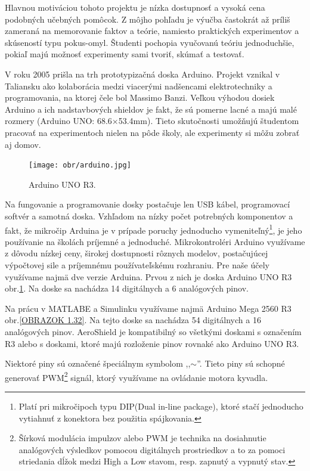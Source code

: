 Hlavnou motiváciou tohoto projektu je nízka dostupnosť a vysoká cena podobných učebných pomôcok. Z môjho pohľadu je výučba častokrát až príliš zameraná na memorovanie faktov a teórie, namiesto praktických experimentov a skúseností typu pokus-omyl. Študenti pochopia vyučovanú teóriu jednoduchšie, pokiaľ majú možnosť experimenty sami tvoriť, skúmať a testovať\cite{Dhanapal2013ASO}. 

V roku 2005 prišla na trh prototypizačná doska Arduino. Projekt vznikal v Taliansku ako kolaborácia medzi viacerými nadšencami elektrotechniky a programovania, na ktorej čele bol Massimo Banzi. Veľkou výhodou dosiek Arduino a ich nadstavbových shieldov je fakt, že sú pomerne lacné a majú malé rozmery (Arduino UNO: 68.6$\times$53.4mm\cite{UNO}). Tieto skutočnosti umožňujú študentom pracovať na experimentoch nielen na pôde školy, ale experimenty si môžu zobrať aj domov. 

\begin{figure}[!tbh]
	\centering
	\texttt{[image: obr/arduino.jpg]}
	\caption{{Arduino UNO R3\cite{UNOFOTO}.}}\label{OBRAZOK 1.3}
\end{figure}

Na fungovanie a programovanie dosky postačuje len USB kábel, programovací softvér a samotná doska. Vzhľadom na nízky počet potrebných komponentov a fakt, že mikročip Arduina je v prípade poruchy jednoducho vymeniteľný\footnote[2]{Platí pri mikročipoch typu DIP(Dual in-line package), ktoré stačí jednoducho vytiahnuť z konektora bez použitia spájkovania.}, je jeho používanie na školách príjemné a jednoduché. Mikrokontroléri Arduino využívame z dôvodu nízkej ceny, širokej dostupnosti rôznych modelov, postačujúcej výpočtovej sile a príjemnému používateľskému rozhraniu. Pre naše účely využívame najmä dve verzie Arduina. Prvou z nich je doska Arduino UNO R3  obr.\ref{OBRAZOK 1.3}. Na doske sa nachádza 14 digitálnych a 6 analógových pinov.

Na prácu v MATLABE a Simulinku využívame najmä Arduino Mega 2560 R3 obr.\ref{OBRAZOK 1.32}. Na tejto doske sa nachádza 54 digitálnych a 16 analógových pinov. AeroShield je kompatibilný so všetkými doskami s označením R3 alebo s doskami, ktoré majú rozloženie pinov rovnaké ako Arduino UNO R3. 

Niektoré piny sú označené špeciálnym symbolom ,,$\sim$''. Tieto piny sú schopné generovať PWM\footnote[3]{Šírková modulácia impulzov alebo PWM je technika na dosiahnutie analógových výsledkov pomocou digitálnych prostriedkov a to za pomoci striedania dĺžok medzi High a Low stavom, resp. zapnutý a vypnutý stav.} signál, ktorý využívame na ovládanie motora kyvadla.

